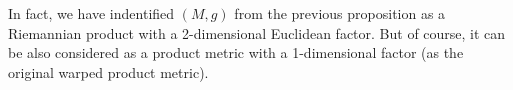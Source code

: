 \documentclass[a4paper,10.9pt]{amsart}
\newtheorem{proposition}[theorem]{Proposition}
\newtheorem{corollary}[theorem]{Corollary}
\theoremstyle{definition}
\theoremstyle{remark}
\newcommand{\III}{{{{\bf\rm I\hspace{-.2mm} I \hspace{-.2mm} I}}{\hspace{.2mm}}}{}}
\numberwithin{equation}{section}
\renewcommand{\=}{\stackrel \Sigma =}
\begin{document}
In fact, we have indentified $(M,g)$ from the previous proposition as a Riemannian product 
with a 2-dimensional Euclidean factor. But of course, it can be also considered as a product metric with a 1-dimensional
factor (as the original warped product metric).



\end{document}
